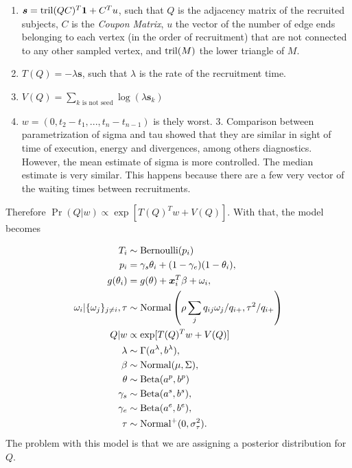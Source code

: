 \begin{enumerate}
  \item $\boldsymbol{s} = \operatorname{tril}(QC)^T \boldsymbol{1} + C^Tu$, such that $Q$ is the
  adjacency matrix of the recruited subjects, $C$ is the {\em Coupon Matrix},
  $u$ the vector of the number of edge ends belonging to each vertex
  (in the order of recruitment) that are not connected to any other sampled
  vertex, and $\operatorname{tril}(M)$ the lower triangle of $M$. 

  \item $T(Q) = -\lambda \boldsymbol{s}$, such that $\lambda$ is the rate of
  the recruitment time. 

  \item $V(Q) = \sum_{k \text{ is not seed}} \log(\lambda \boldsymbol{s}_k)$
  
  \item $w = (0, t_2 - t_1, ..., t_n - t_{n-1})$ is thely worst.
  3. Comparison between parametrization of sigma and tau showed that they are
  similar in sight of time of execution, energy and divergences, among others
  diagnostics. However, the mean estimate of sigma is more controlled. The
  median estimate is very similar. This happens because there are a few very
   vector of the waiting times between
  recruitments.  
\end{enumerate}

Therefore $\Pr(Q|w) \propto \exp[T(Q)^Tw + V(Q)]$. With that, the model
becomes 

\begin{equation}
  \begin{aligned}
    T_i &\sim \operatorname{Bernoulli}(p_i) \\
    p_i &= \gamma_s\theta_i + (1-\gamma_e)(1 - \theta_i),  \\
    g(\theta_i) &= g(\theta) + \boldsymbol{x}_i^T\beta + \omega_i,  \\
    \omega_i|\{\omega_j\}_{j\neq i}, \tau &\sim \operatorname{Normal}\left(\rho\sum_j q_{ij}\omega_j/q_{i+}, \tau^2/q_{i+}\right) \\
    Q|w &\propto \exp[T(Q)^Tw + V(Q)] \\
    \lambda &\sim \Gamma(a^{\lambda}, b^{\lambda}), \\ 
    \beta &\sim \operatorname{Normal}(\mu, \Sigma), \\ 
    \theta &\sim \operatorname{Beta}(a^p, b^p) \\
    \gamma_s &\sim \operatorname{Beta}(a^s, b^s), \\
    \gamma_e &\sim \operatorname{Beta}(a^e, b^e), \\  
    \tau &\sim \operatorname{Normal}^+(0,\sigma^2_{\tau}).
  \end{aligned}  
\end{equation}
The problem with this model is that we are assigning a posterior distribution
for $Q$.

